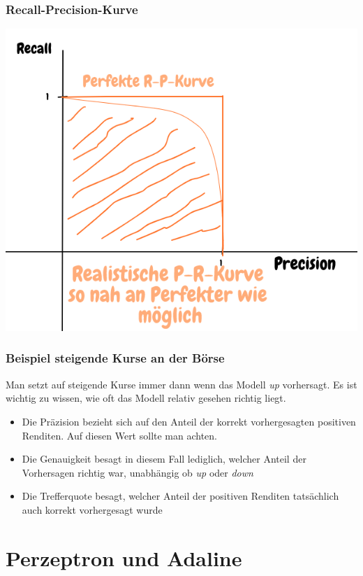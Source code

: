 \documentclass{report}
\begin{document}
\subsection{Recall-Precision-Kurve}
\begin{center}
  \includegraphics[scale=.225]{ml03_8}
\end{center}

\subsection{Beispiel steigende Kurse an der Börse}
Man setzt auf steigende Kurse immer dann wenn das Modell \textit{up} vorhersagt. Es ist wichtig zu wissen, wie oft das Modell relativ gesehen richtig liegt.
\begin{itemize}
  \item Die Präzision bezieht sich auf den Anteil der korrekt vorhergesagten positiven Renditen. Auf diesen Wert sollte man achten.
  \item Die Genauigkeit besagt in diesem Fall lediglich, welcher Anteil der Vorhersagen richtig war, unabhängig ob \textit{up} oder \textit{down}
  \item Die Trefferquote besagt, welcher Anteil der positiven Renditen tatsächlich auch korrekt vorhergesagt wurde
\end{itemize}

\chapter{Perzeptron und Adaline}
\end{document}
